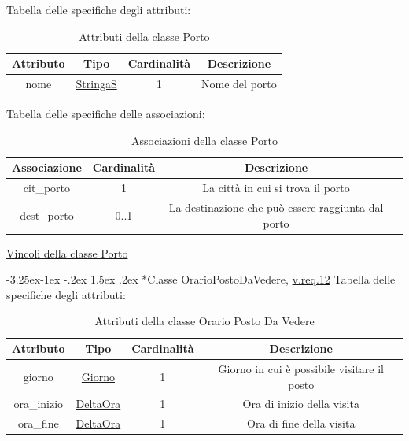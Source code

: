 \documentclass{article}
\makeatletter
\renewcommand\subsection{\@startsection{subsection}{2}{\z@}%
                                     {-3.25ex\@plus -1ex \@minus -.2ex}%
                                     {1.5ex \@plus .2ex}%
                                     {\normalfont\normalsize\bfseries}}
\makeatother
\begin{document}
Tabella delle specifiche degli attributi:
\begin{table}[h!]
    \centering
    \begin{tabular}{|c|c|c|c|}
        \hline
        Attributo & Tipo & Cardinalità & Descrizione \\
        \hline
        nome & \hyperref[sec:StringaS]{StringaS} & 1 & Nome del porto \\
        \hline
    \end{tabular}
    \caption{Attributi della classe Porto}
\end{table}

Tabella delle specifiche delle associazioni:
\begin{table}[h!]
    \centering
    \begin{tabular}{|c|c|c|c|}
        \hline
        Associazione & Cardinalità & Descrizione \\
        \hline
        cit\_porto & 1 & La città in cui si trova il porto \\
        dest\_porto & 0..1 & La destinazione che può essere raggiunta dal porto \\
        \hline
    \end{tabular}
    \caption{Associazioni della classe Porto}
\end{table}

\hyperref[sec:VincoliPorto]{Vincoli della classe Porto}

\subsection*{Classe OrarioPostoDaVedere, \hyperref[sec:RequisitiOrarioPostoDaVedere]{v.req.12}}\label{sec:OrarioPostoDaVedere}
Tabella delle specifiche degli attributi:
\begin{table}[h!]
    \centering
    \begin{tabular}{|c|c|c|c|}
        \hline
        Attributo & Tipo & Cardinalità & Descrizione \\
        \hline
        giorno & \hyperref[sec:Giorno]{Giorno} & 1 & Giorno in cui è possibile visitare il posto \\
        ora\_inizio & \hyperref[sec:DeltaOra]{DeltaOra} & 1 & Ora di inizio della visita \\
        ora\_fine & \hyperref[sec:DeltaOra]{DeltaOra} & 1 & Ora di fine della visita \\
        \hline
    \end{tabular}
    \caption{Attributi della classe Orario Posto Da Vedere}
\end{table}
\end{document}
